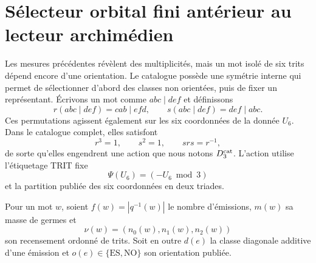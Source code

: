 \section{Sélecteur orbital fini antérieur au lecteur archimédien}
\label{sec:selector-orbital-constantes}

Les mesures précédentes révèlent des multiplicités, mais un mot isolé de
six trits dépend encore d'une orientation. Le catalogue possède une symétrie
interne qui permet de sélectionner d'abord des classes non orientées, puis de fixer
un représentant. Écrivons un mot comme \(abc\mid def\) et définissons
\[
 r(abc\mid def)=cab\mid efd,
 \qquad
 s(abc\mid def)=def\mid abc.
\]
Ces permutations agissent également sur les six coordonnées de la donnée
\(U_6\). Dans le catalogue complet, elles satisfont
\[
 r^3=1,
 \qquad s^2=1,
 \qquad srs=r^{-1},
\]
de sorte qu'elles engendrent une action que nous notons \(D_3^{\rm cat}\). L'action utilise
l'étiquetage TRIT fixe
\[
 \Psi(U_6)=(-U_6\bmod3)
\]
et la partition publiée des six coordonnées en deux triades.

Pour un mot \(w\), soient \(f(w)=|q^{-1}(w)|\) le nombre d'émissions,
\(m(w)\) sa masse de germes et
\[
 \nu(w)=(n_0(w),n_1(w),n_2(w))
\]
son recensement ordonné de trits. Soit en outre \(d(e)\) la classe diagonale additive d'une
émission et \(o(e)\in\{\mathrm{ES},\mathrm{NO}\}\) son orientation
publiée.

